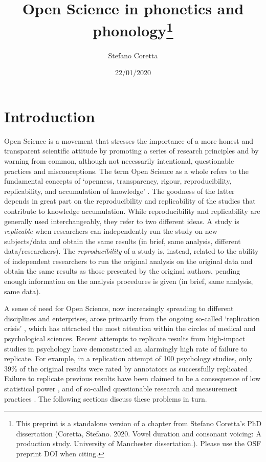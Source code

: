 \documentclass[12pt,a4paper,]{article}
\title{Open Science in phonetics and
phonology\footnote{This preprint is a standalone version of a chapter from Stefano Coretta's PhD dissertation (Coretta, Stefano. 2020. Vowel duration and consonant voicing: A production study. University of Manchester dissertation.). Please use the OSF preprint DOI when citing.}}
\author{Stefano Coretta}
\date{22/01/2020}
\begin{document}
\maketitle

\hypertarget{introduction}{%
\section{Introduction}\label{introduction}}

Open Science is a movement that stresses the importance of a more honest
and transparent scientific attitude by promoting a series of research
principles and by warning from common, although not necessarily
intentional, questionable practices and misconceptions. The term Open
Science as a whole refers to the fundamental concepts of `openness,
transparency, rigour, reproducibility, replicability, and accumulation
of knowledge' \citep[3]{cruwell2018}. The goodness of the latter depends
in great part on the reproducibility and replicability of the studies
that contribute to knowledge accumulation. While reproducibility and
replicability are generally used interchangeably, they refer to two
different ideas. A study is \emph{replicable} when researchers can
independently run the study on new subjects/data and obtain the same
results (in brief, same analysis, different data/researchers). The
\emph{reproducibility} of a study is, instead, related to the ability of
independent researchers to run the original analysis on the original
data and obtain the same results as those presented by the original
authors, pending enough information on the analysis procedures is given
(in brief, same analysis, same data).

A sense of need for Open Science, now increasingly spreading to
different disciplines and enterprises, arose primarily from the ongoing
so-called `replication crisis' \citep{pashler2012, schooler2014}, which
has attracted the most attention within the circles of medical and
psychological sciences. Recent attempts to replicate results from
high-impact studies in psychology have demonstrated an alarmingly high
rate of failure to replicate. For example, in a replication attempt of
100 psychology studies, only 39\% of the original results were rated by
annotators as successfully replicated
\citep{open-science-collaboration2015}. Failure to replicate previous
results have been claimed to be a consequence of low statistical power
\citep{button2013}, and of so-called questionable research and
measurement practices \citep{simmons2011, morin2015, flake2019}. The
following sections discuss these problems in turn.
\end{document}
